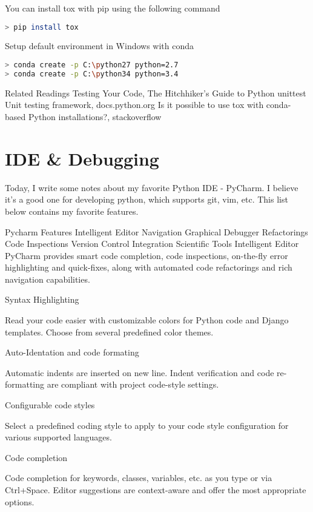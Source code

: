 You can install tox with pip using the following command

\begin{lstlisting}[language=bash]
> pip install tox
\end{lstlisting}

Setup default environment in Windows with conda

\begin{lstlisting}[language=bash]
> conda create -p C:\python27 python=2.7
> conda create -p C:\python34 python=3.4
\end{lstlisting}

Related Readings
Testing Your Code, The Hitchhiker's Guide to Python
unittest  Unit testing framework, docs.python.org
Is it possible to use tox with conda-based Python installations?, stackoverflow

\section{IDE \& Debugging}

Today, I write some notes about my favorite Python IDE - PyCharm. I believe it's a good one for developing python, which supports git, vim, etc. This list below contains my favorite features.

Pycharm Features
Intelligent Editor
Navigation
Graphical Debugger
Refactorings
Code Inspections
Version Control Integration
Scientific Tools
Intelligent Editor
PyCharm provides smart code completion, code inspections, on-the-fly error highlighting and quick-fixes, along with automated code refactorings and rich navigation capabilities.

Syntax Highlighting

Read your code easier with customizable colors for Python code and Django templates. Choose from several predefined color themes.

Auto-Identation and code formating

Automatic indents are inserted on new line. Indent verification and code re-formatting are compliant with project code-style settings.

Configurable code styles

Select a predefined coding style to apply to your code style configuration for various supported languages.

Code completion

Code completion for keywords, classes, variables, etc. as you type or via Ctrl+Space. Editor suggestions are context-aware and offer the most appropriate options.

